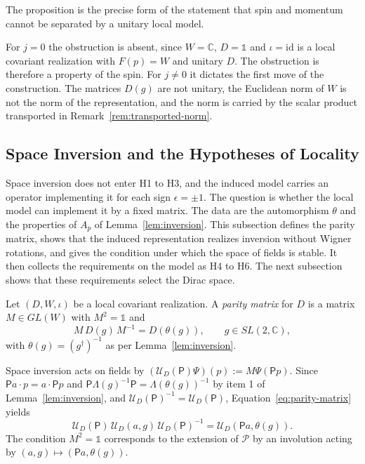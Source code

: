 \noindent The proposition is the precise form of the statement that spin and momentum cannot be separated by a unitary local model.

\begin{remark}
	For $j=0$ the obstruction is absent, since $W=\mathbb{C}$, $D=\mathbb{1}$ and $\iota=\mathrm{id}$ is a local covariant realization with $F(p)=W$ and unitary $D$. The obstruction is therefore a property of the spin. For $j\neq0$ it dictates the first move of the construction. The matrices $D(g)$ are not unitary, the Euclidean norm of $W$ is not the norm of the representation, and the norm is carried by the scalar product transported in Remark~\ref{rem:transported-norm}.
\end{remark}

\subsection{Space Inversion and the Hypotheses of Locality}
\label{subsec:parity-hypotheses}

Space inversion does not enter H1 to H3, and the induced model carries an operator implementing it for each sign $\epsilon=\pm1$. The question is whether the local model can implement it by a fixed matrix. The data are the automorphism $\theta$ and the properties of $A_p$ of Lemma~\ref{lem:inversion}. This subsection defines the parity matrix, shows that the induced representation realizes inversion without Wigner rotations, and gives the condition under which the space of fields is stable. It then collects the requirements on the model as H4 to H6. The next subsection shows that these requirements select the Dirac space.

\begin{definition}\label{def:parity-realization}
	Let $(D,W,\iota)$ be a local covariant realization. A \emph{parity matrix} for $D$ is a matrix $M\in GL(W)$ with $M^2=\mathbb{1}$ and
	\begin{equation}\label{eq:parity-matrix}
		M\,D(g)\,M^{-1}=D(\theta(g)),\qquad g\in SL(2,\mathbb{C}),
	\end{equation}
	with $\theta(g)=(g^\dagger)^{-1}$ as per Lemma~\ref{lem:inversion}.
\end{definition}

\begin{remark}\label{rem:parity-action}
	Space inversion acts on fields by $(\mathcal{U}_D(\mathsf{P})\Psi)(p):=M\Psi(\mathsf{P}p)$. Since $\mathsf{P}a\cdot p=a\cdot\mathsf{P}p$ and $\mathsf{P}\Lambda(g)^{-1}\mathsf{P}=\Lambda(\theta(g))^{-1}$ by item 1 of Lemma~\ref{lem:inversion}, and $\mathcal{U}_D(\mathsf{P})^{-1}=\mathcal{U}_D(\mathsf{P})$, Equation~\eqref{eq:parity-matrix} yields
	\begin{equation*}
		\mathcal{U}_D(\mathsf{P})\,\mathcal{U}_D(a,g)\,\mathcal{U}_D(\mathsf{P})^{-1}=\mathcal{U}_D(\mathsf{P}a,\theta(g)).
	\end{equation*}
	The condition $M^2=\mathbb{1}$ corresponds to the extension of $\mathcal{P}$ by an involution acting by $(a,g)\mapsto(\mathsf{P}a,\theta(g))$.
\end{remark}

